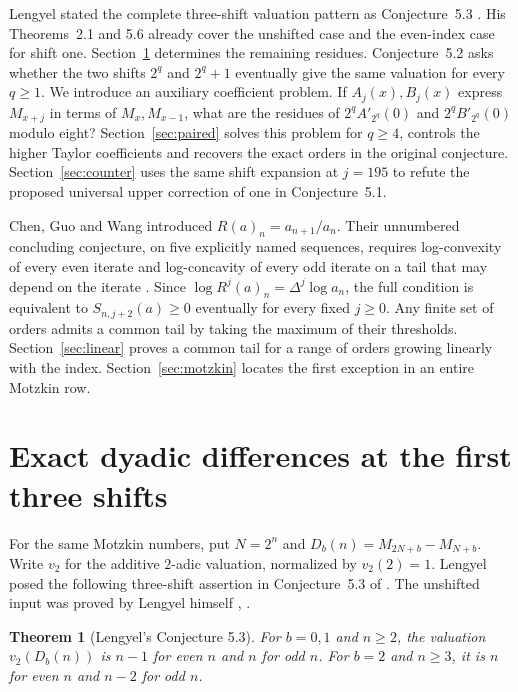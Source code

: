 \documentclass[11pt,a4paper]{article}
\newtheorem{theorem}{Theorem}[section]
\begin{document}
Lengyel stated the complete three-shift valuation pattern as Conjecture~5.3
\cite[pp.~132--135]{lengyel13}. His Theorems~2.1 and 5.6 already cover the
unshifted case and the even-index case for shift one. Section~\ref{sec:lengyel} determines the remaining residues. Conjecture~5.2
asks whether the two shifts $2^q$ and $2^q+1$ eventually give the same
valuation for every $q\ge1$. We introduce an auxiliary coefficient problem.
If $A_j(x),B_j(x)$ express $M_{x+j}$ in terms of $M_x,M_{x-1}$, what are the
residues of $2^q A'_{2^q}(0)$ and $2^q B'_{2^q}(0)$ modulo eight?
Section~\ref{sec:paired} solves this problem for $q\ge4$, controls the higher
Taylor coefficients and recovers the exact orders in the original conjecture.
Section~\ref{sec:counter} uses the same shift expansion at $j=195$ to refute
the proposed universal upper correction of one in Conjecture~5.1.

Chen, Guo and Wang introduced $R(a)_n=a_{n+1}/a_n$. Their unnumbered
concluding conjecture, on five explicitly named sequences, requires
log-convexity of every even iterate and log-concavity of every odd iterate
on a tail that may depend on the iterate \cite[pp.~24--25 of the preprint]{cgw}.
Since $\log R^j(a)_n=\Delta^j\log a_n$, the full condition is equivalent to
$S_{n,j+2}(a)\ge0$ eventually for every fixed $j\ge0$. Any finite set of
orders admits a common tail by taking the maximum of their thresholds.
Section~\ref{sec:linear} proves a common tail for a range of orders growing
linearly with the index. Section~\ref{sec:motzkin} locates the first
exception in an entire Motzkin row.

\section{Exact dyadic differences at the first three shifts}
\label{sec:lengyel}
For the same Motzkin numbers, put $N=2^n$ and
$D_b(n)=M_{2N+b}-M_{N+b}$. Write $v_2$ for the additive
$2$-adic valuation, normalized by $v_2(2)=1$. Lengyel
posed the following three-shift assertion in Conjecture~5.3 of
\cite{lengyel13}. The unshifted input was proved by Lengyel himself
\cite[Theorem~5.6]{lengyel13}, \cite{lengyel14}.

\begin{theorem}[Lengyel's Conjecture 5.3]
For $b=0,1$ and $n\ge2$, the valuation $v_2(D_b(n))$ is $n-1$ for
even $n$ and $n$ for odd $n$. For $b=2$ and $n\ge3$, it is $n$ for
even $n$ and $n-2$ for odd $n$.
\end{theorem}
\end{document}
